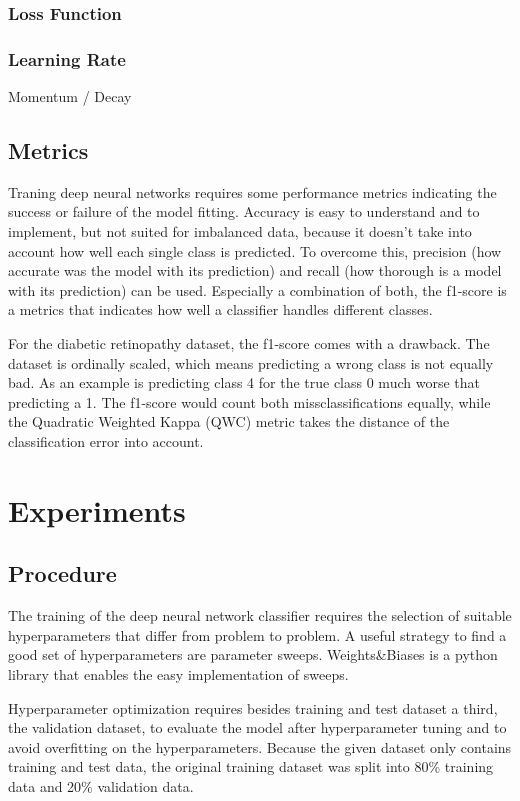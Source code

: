 \documentclass{article}
\begin{document}
\subsubsection{Loss Function}
\subsubsection{Learning Rate}
Momentum / Decay

\subsection{Metrics}
Traning deep neural networks requires some performance metrics indicating the success or failure of the model fitting. Accuracy
is easy to understand and to implement, but not suited for imbalanced data, because it doesn't take into account how well each 
single class is predicted. 
To overcome this, precision (how accurate was the model with its prediction) and recall (how thorough is a model with its prediction) can be used. 
Especially a combination of both, the f1-score is a metrics that indicates how well a classifier handles different classes.

For the diabetic retinopathy dataset, the f1-score comes with a drawback. The dataset is ordinally scaled, which means predicting 
a wrong class is not equally bad. As an example is predicting class 4 for the true class 0 much worse that predicting a 1. The
f1-score would count both missclassifications equally, while the Quadratic Weighted Kappa (QWC) metric takes the distance of 
the classification error into account.
\section{Experiments}
\subsection{Procedure}
The training of the deep neural network classifier requires the selection of suitable hyperparameters that differ from
problem to problem. A useful strategy to find a good set of hyperparameters are parameter sweeps. Weights\&Biases is a 
python library that enables the easy implementation of sweeps. 

Hyperparameter optimization requires besides training and test dataset a third, the validation dataset, to evaluate the
model after hyperparameter tuning and to avoid overfitting on the hyperparameters. Because the given dataset only contains 
training and test data, the original training dataset was split into 80\% training data and 20\% validation data.
\end{document}
